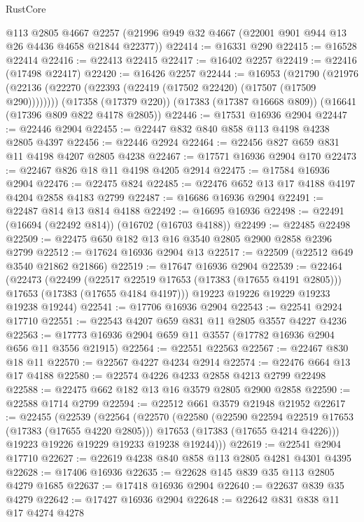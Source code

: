 \begin{lexlean}{RustCore}
\begin{coremodule}
    @113
    @2805
    @4667
    @2257
    (@21996 @949 @32 @4667 (@22001 @901 @944 @13 @26 @4436 @4658 @21844 @22377))
@22414 := @16331 @290
@22415 := @16528 @22414
@22416 := @22413 @22415
@22417 := @16402 @2257
@22419 := @22416 (@17498 @22417)
@22420 := @16426 @2257
@22444 := @16953
    (@21790 (@21976 (@22136 (@22270 (@22393 (@22419 (@17502 @22420) (@17507 (@17509 @290))))))))
    (@17358 (@17379 @220))
    (@17383 (@17387 @16668 @809))
    (@16641 (@17396 @809 @822 @4178 @2805))
@22446 := @17531 @16936 @2904
@22447 := @22446 @2904
@22455 := @22447 @832 @840 @858 @113 @4198 @4238 @2805 @4397
@22456 := @22446 @2924
@22464 := @22456 @827 @659 @831 @11 @4198 @4207 @2805 @4238
@22467 := @17571 @16936 @2904 @170
@22473 := @22467 @826 @18 @11 @4198 @4205 @2914
@22475 := @17584 @16936 @2904
@22476 := @22475 @824
@22485 := @22476 @652 @13 @17 @4188 @4197 @4204 @2858 @4183 @2799
@22487 := @16686 @16936 @2904
@22491 := @22487 @814 @13 @814 @4188
@22492 := @16695 @16936
@22498 := @22491 (@16694 (@22492 @814)) (@16702 (@16703 @4188))
@22499 := @22485 @22498
@22509 := @22475 @650 @182 @13 @16 @3540 @2805 @2900 @2858 @2396 @2799
@22512 := @17624 @16936 @2904 @13
@22517 := @22509 (@22512 @649 @3540 @21862 @21866)
@22519 := @17647 @16936 @2904
@22539 := @22464
    (@22473
      (@22499
        (@22517 @22519 @17653 (@17383 (@17655 @4191 @2805)))
        @17653
        (@17383 (@17655 @4184 @4197)))
      @19223
      @19226
      @19229
      @19233
      @19238
      @19244)
@22541 := @17706 @16936 @2904
@22543 := @22541 @2924 @17710
@22551 := @22543 @4207 @659 @831 @11 @2805 @3557 @4227 @4236
@22563 := @17773 @16936 @2904 @659 @11 @3557 (@17782 @16936 @2904 @656 @11 @3556 @21915)
@22564 := @22551 @22563
@22567 := @22467 @830 @18 @11
@22570 := @22567 @4227 @4234 @2914
@22574 := @22476 @664 @13 @17 @4188
@22580 := @22574 @4226 @4233 @2858 @4213 @2799 @22498
@22588 := @22475 @662 @182 @13 @16 @3579 @2805 @2900 @2858
@22590 := @22588 @1714 @2799
@22594 := @22512 @661 @3579 @21948 @21952
@22617 := @22455
    (@22539
      (@22564
        (@22570
          (@22580
            (@22590 @22594 @22519 @17653 (@17383 (@17655 @4220 @2805)))
            @17653
            (@17383 (@17655 @4214 @4226)))
          @19223
          @19226
          @19229
          @19233
          @19238
          @19244)))
@22619 := @22541 @2904 @17710
@22627 := @22619 @4238 @840 @858 @113 @2805 @4281 @4301 @4395
@22628 := @17406 @16936
@22635 := @22628 @145 @839 @35 @113 @2805 @4279 @1685
@22637 := @17418 @16936 @2904
@22640 := @22637 @839 @35 @4279
@22642 := @17427 @16936 @2904
@22648 := @22642 @831 @838 @11 @17 @4274 @4278

\end{coremodule}
\end{lexlean}
